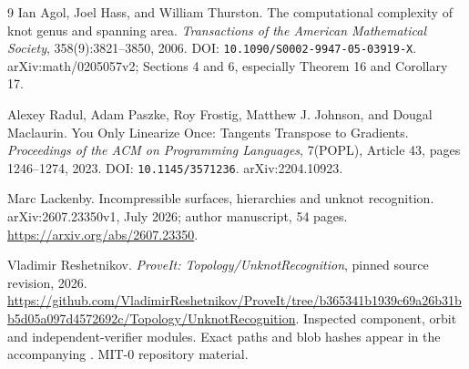 \begin{thebibliography}{9}
Ian Agol, Joel Hass, and William Thurston.
\newblock The computational complexity of knot genus and spanning area.
\newblock \emph{Transactions of the American Mathematical Society},
358(9):3821--3850, 2006.
\newblock DOI: \texttt{10.1090/S0002-9947-05-03919-X}.
\newblock arXiv:math/0205057v2; Sections 4 and 6, especially Theorem 16 and Corollary 17.

Alexey Radul, Adam Paszke, Roy Frostig, Matthew J. Johnson, and Dougal Maclaurin.
\newblock You Only Linearize Once: Tangents Transpose to Gradients.
\newblock \emph{Proceedings of the ACM on Programming Languages},
7(POPL), Article 43, pages 1246--1274, 2023.
\newblock DOI: \texttt{10.1145/3571236}. arXiv:2204.10923.

Marc Lackenby.
\newblock Incompressible surfaces, hierarchies and unknot recognition.
\newblock arXiv:2607.23350v1, July 2026; author manuscript, 54 pages.
\newblock \url{https://arxiv.org/abs/2607.23350}.

Vladimir Reshetnikov.
\newblock \emph{ProveIt: Topology/UnknotRecognition}, pinned source revision, 2026.
\newblock \url{https://github.com/VladimirReshetnikov/ProveIt/tree/b365341b1939c69a26b31bb5d05a097d4572692c/Topology/UnknotRecognition}.
\newblock Inspected component, orbit and independent-verifier modules. Exact
paths and blob hashes appear in the accompanying .
MIT-0 repository material.
\end{thebibliography}
